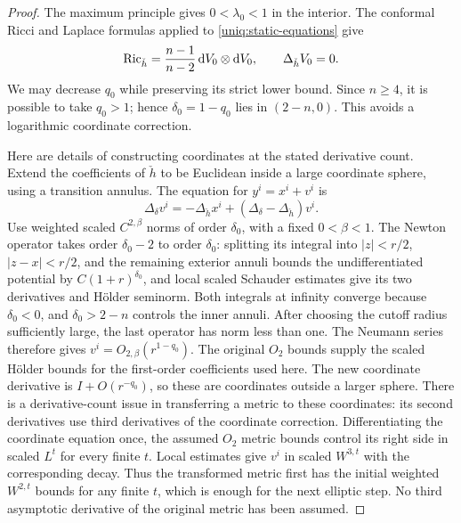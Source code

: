 \begin{proof}
The maximum principle gives $0<\lambda_0<1$ in the interior. The
conformal Ricci and Laplace formulas applied to
\eqref{uniq:static-equations} give
\begin{equation}\label{uniq:harmonic-ricci}
 \operatorname{Ric}_{\check h}=\frac{n-1}{n-2}\,\mathrm d V_0\otimes\mathrm d V_0,
 \qquad \Delta_{\check h}V_0=0.
\end{equation}
We may decrease $q_0$ while preserving its strict lower bound. Since
$n\geq4$, it is possible to take $q_0>1$; hence
$\delta_0=1-q_0$ lies in $(2-n,0)$. This avoids a logarithmic
coordinate correction.

Here are details of constructing coordinates at the stated derivative
count. Extend the coefficients of $\check h$ to be Euclidean inside
a large coordinate sphere, using a transition annulus. The equation
for $y^i=x^i+v^i$ is
\[
 \Delta_\delta v^i=-\Delta_{\check h}x^i
                 +(\Delta_\delta-\Delta_{\check h})v^i.
\]
Use weighted scaled $C^{2,\beta}$ norms of order $\delta_0$,
with a fixed $0<\beta<1$. The Newton operator takes order
$\delta_0-2$ to order $\delta_0$: splitting its integral into
$|z|<r/2$, $|z-x|<r/2$, and the remaining exterior annuli bounds the
undifferentiated potential by $C(1+r)^{\delta_0}$, and local scaled
Schauder estimates give its two derivatives and H\"older seminorm.
Both integrals at infinity converge because $\delta_0<0$, and
$\delta_0>2-n$ controls the inner annuli. After choosing the cutoff
radius sufficiently large, the last operator has norm less than one.
The Neumann series therefore gives
$v^i=O_{2,\beta}(r^{1-q_0})$. The original $O_2$ bounds supply the
scaled H\"older bounds for the first-order coefficients used here.
The new coordinate derivative is $I+O(r^{-q_0})$, so these are
coordinates outside a larger sphere. There is a derivative-count
issue in transferring a metric to these coordinates: its second
derivatives use third derivatives of the coordinate correction.
Differentiating the coordinate equation once, the assumed $O_2$
metric bounds control its right side in scaled $L^t$ for every
finite $t$. Local estimates give $v^i$ in scaled $W^{3,t}$ with
the corresponding decay. Thus the transformed metric first has
the initial weighted $W^{2,t}$ bounds for any finite $t$, which
is enough for the next elliptic step. No third asymptotic
derivative of the original metric has been assumed.


\end{proof}
